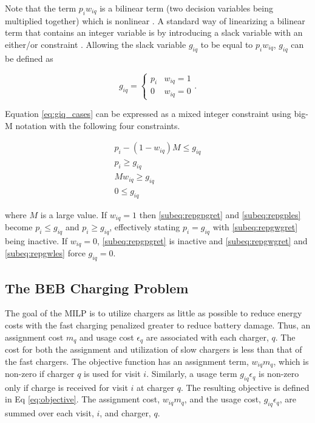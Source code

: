 \documentclass[utf8]{FrontiersinHarvard}
\let\cite\citep                                                                 %
\begin{document}
Note that the term $p_i w_{iq}$ is a bilinear term (two decision variables being multiplied together) which is nonlinear
\cite{Rodriguez2013}. A standard way of linearizing a bilinear term that contains an integer variable is by introducing
a slack variable with an either/or constraint \cite{Chen2010,Rodriguez2013}. Allowing the slack variable $g_{iq}$ to be
equal to $p_i w_{iq}$, $g_{iq}$ can be defined as

\begin{equation}
    \label{eq:giq_cases}
    g_{iq} =
    \begin{cases}
        p_i & w_{iq} = 1 \\
        0 & w_{iq} = 0
    \end{cases}.
\end{equation}

Equation \eqref{eq:giq_cases} can be expressed as a mixed integer constraint using big-M notation with the following
four constraints.

\begin{subequations}
    \label{eq:slack_gain}
\begin{align}
    p_i - (1 - w_{iq})M \leq g_{iq}  \label{subeq:repgpgret} \\
    p_i \geq g_{iq}                 \label{subeq:repgples} \\
    Mw_{iq} \geq g_{iq}              \label{subeq:repgwgret} \\
    0 \leq g_{iq}                   \label{subeq:repgwles}
\end{align}
\end{subequations}

\noindent
where $M$ is a large value. If $w_{iq} = 1$ then \eqref{subeq:repgpgret} and \eqref{subeq:repgples} become $p_i \leq
g_{iq}$ and $p_i \geq g_{iq}$, effectively stating $p_i = g_{iq}$ with \eqref{subeq:repgwgret} being inactive. If $w_{iq} =
0$, \eqref{subeq:repgpgret} is inactive and \eqref{subeq:repgwgret} and \eqref{subeq:repgwles} force $g_{iq} = 0$.

\subsection{The BEB Charging Problem} \label{sec:BEB_MILP}
The goal of the MILP is to utilize chargers as little as possible to reduce energy costs with the fast charging
penalized greater to reduce battery damage. Thus, an assignment cost $m_q$ and usage cost $\epsilon_q$ are associated with each
charger, $q$. The cost for both the assignment and utilization of slow chargers is less than that of the fast chargers.
The objective function has an assignment term, $w_{iq}m_q$, which is non-zero if charger $q$ is used for visit $i$.
Similarly, a usage term $g_{iq} \epsilon_q$ is non-zero only if charge is received for visit $i$ at charger $q$. The resulting
objective is defined in Eq \ref{eq:objective}. The assignment cost, $w_{iq}m_q$, and the usage cost, $g_{iq}\epsilon_q$, are
summed over each visit, $i$, and charger, $q$.
\end{document}
